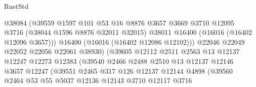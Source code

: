 \begin{lexlean}{RustStd}
\begin{coremodule}
                                    @38084
                                    (@39559
                                      @1597
                                      @101
                                      @53
                                      @16
                                      @8876
                                      @3657
                                      @3669
                                      @3710
                                      @12095
                                      @3716
                                      (@38044 @1596 @8876 @32011 @32015)
                                      @38011
                                      @16400
                                      (@16016 (@16402 @12096 @3657)))
                                    @16400
                                    (@16016 (@16402 @12086 @12102)))
                                  @22046
                                  @22049
                                  @22052
                                  @22056
                                  @22061
                                  @38930)
                                (@39605
                                  @12112
                                  @2511
                                  @2563
                                  @13
                                  @12137
                                  @12247
                                  @12273
                                  @12383
                                  (@39540
                                    @2466
                                    @2488
                                    @2510
                                    @13
                                    @12137
                                    @12146
                                    @3657
                                    @12247
                                    (@39551
                                      @2465
                                      @317
                                      @126
                                      @12137
                                      @12144
                                      @4898
                                      (@39560
                                        @2464
                                        @53
                                        @55
                                        @5037
                                        @12136
                                        @12143
                                        @3710
                                        @12117
                                        @3716

\end{coremodule}
\end{lexlean}
